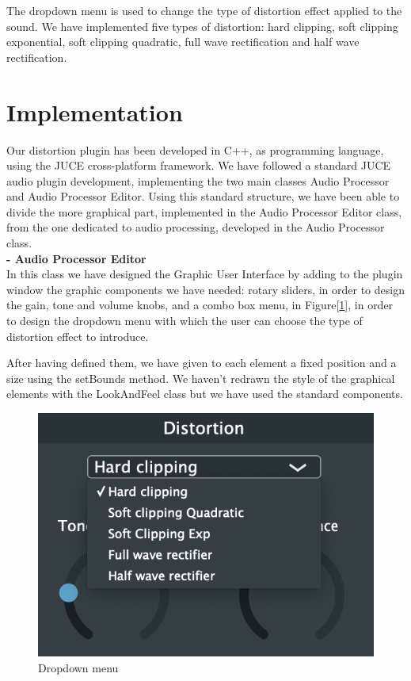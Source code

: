 \documentclass[letterpaper, 12pt]{article}
\begin{document}
	The dropdown menu is used to change the type of distortion effect applied to the sound. We have implemented five types of distortion: hard clipping, soft clipping exponential, soft clipping quadratic, full wave rectification and half wave rectification.
	
	\section{Implementation}
	
	Our distortion plugin has been developed in C++, as programming language, using the JUCE cross-platform framework. We have followed a standard JUCE audio plugin development, implementing the two main classes Audio Processor and Audio Processor Editor. 
	Using this standard structure, we have been able to divide the more graphical part, implemented in the Audio Processor Editor class, from the one dedicated to audio processing, developed in the Audio Processor class.
	\\
	
	\textbf{-	Audio Processor Editor} 
\\
	
	In this class we have designed the Graphic User Interface by adding to the plugin window the graphic components we have needed: rotary sliders, in order to design the gain, tone and volume knobs, and a combo box menu, in Figure[\ref{fig:combobox}], in order to design the dropdown menu with which the user can choose the type of distortion effect to introduce.
	
	After having defined them, we have given to each element a fixed position and a size using the setBounds method.
	We haven’t redrawn the style of the graphical elements with the LookAndFeel class but we have used the standard components.
	\\
	
	\begin{figure}[h!]
		\includegraphics[scale=0.6]{combobox.png}
		\centering
		\caption{Dropdown menu}
		\label{fig:combobox}
	\end{figure}
\end{document}
